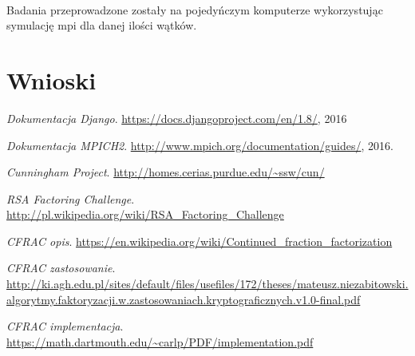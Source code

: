 \documentclass{article}
\begin{document}
\paragraph{}Badania przeprowadzone zostały na pojedyńczym komputerze wykorzystując symulację mpi dla danej ilości wątków.

\section{Wnioski}

\newpage
\begin{thebibliography}{9}
	\emph{Dokumentacja Django}.
	\url{https://docs.djangoproject.com/en/1.8/},
	2016

	\emph{Dokumentacja MPICH2}.
  	\url{http://www.mpich.org/documentation/guides/},
  	2016.

	\emph{Cunningham Project}.
	\url{http://homes.cerias.purdue.edu/~ssw/cun/}

	\emph{RSA Factoring Challenge}.
	\url{http://pl.wikipedia.org/wiki/RSA_Factoring_Challenge}
	
	\emph{CFRAC opis}.
	\url{https://en.wikipedia.org/wiki/Continued_fraction_factorization}

	\emph{CFRAC zastosowanie}.
    \url{http://ki.agh.edu.pl/sites/default/files/usefiles/172/theses/mateusz.niezabitowski.algorytmy.faktoryzacji.w.zastosowaniach.kryptograficznych.v1.0-final.pdf}
    
	\emph{CFRAC implementacja}.
    \url{https://math.dartmouth.edu/~carlp/PDF/implementation.pdf}

\end{thebibliography}
\end{document}
